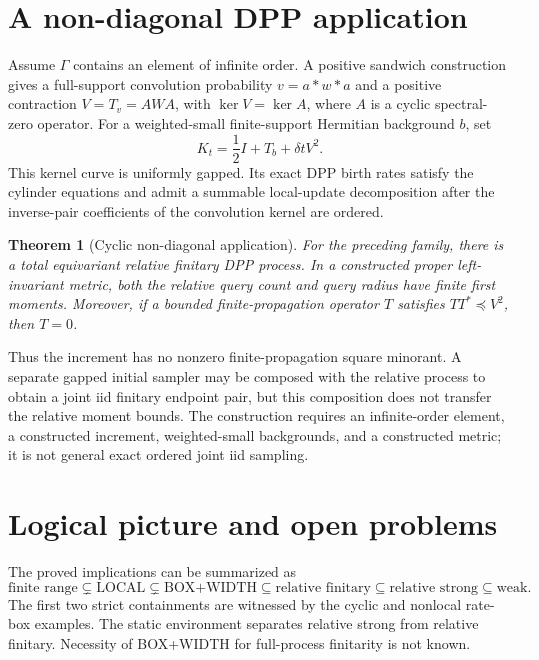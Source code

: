 \documentclass[11pt]{article}
\newtheorem{theorem}{Theorem}[section]
\theoremstyle{definition}
\theoremstyle{remark}
\newcommand{\1}{\mathbf{1}}
\begin{document}
\section{A non-diagonal DPP application}

Assume $\Gamma$ contains an element of infinite order.  A positive sandwich
construction gives a full-support convolution probability $v=a*w*a$ and a
positive contraction $V=T_v=AWA$, with $\ker V=\ker A$, where $A$ is a cyclic
spectral-zero operator.  For a weighted-small finite-support Hermitian
background $b$, set
\[
 K_t=\frac12I+T_b+\delta tV^2.
\]
This kernel curve is uniformly gapped.  Its exact DPP birth rates satisfy the
cylinder equations and admit a summable local-update decomposition after the
inverse-pair coefficients of the convolution kernel are ordered.

\begin{theorem}[Cyclic non-diagonal application]
For the preceding family, there is a total equivariant relative finitary DPP
process.  In a constructed proper left-invariant metric, both the relative
query count and query radius have finite first moments.  Moreover, if a
bounded finite-propagation operator $T$ satisfies $TT^*\preceq V^2$, then
$T=0$.
\end{theorem}

Thus the increment has no nonzero finite-propagation square minorant.  A
separate gapped initial sampler may be composed with the relative process to
obtain a joint iid finitary endpoint pair, but this composition does not
transfer the relative moment bounds.  The construction requires an
infinite-order element, a constructed increment, weighted-small backgrounds,
and a constructed metric; it is not general exact ordered joint iid sampling.

\section{Logical picture and open problems}

The proved implications can be summarized as
\[
 \text{finite range}\subsetneq\text{LOCAL}
 \subsetneq\text{BOX+WIDTH}\subseteq\text{relative finitary}
 \subseteq\text{relative strong}\subseteq\text{weak}.
\]
The first two strict containments are witnessed by the cyclic and nonlocal
rate-box examples.  The static environment separates relative strong from
relative finitary.  Necessity of BOX+WIDTH for full-process finitarity is not
known.
\end{document}
